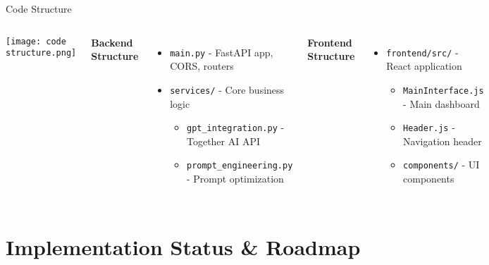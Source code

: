 \documentclass[aspectratio=169,xcolor=dvipsnames]{beamer}
\begin{document}
    \begin{frame}{Code Structure}
        \begin{columns}[c]
            \vspace{-0.5cm}
            \begin{center}
                \texttt{[image: code structure.png]}
            \end{center}

            \textbf{Backend Structure}
            \begin{itemize}
                \item \texttt{main.py} - FastAPI app, CORS, routers
                \item \texttt{services/} - Core business logic
                \begin{itemize}
                    \item \texttt{gpt\_integration.py} - Together AI API
                    \item \texttt{prompt\_engineering.py} - Prompt optimization
                \end{itemize}
            \end{itemize}
            
            \textbf{Frontend Structure}
            \begin{itemize}
                \item \texttt{frontend/src/} - React application
                \begin{itemize}
                    \item \texttt{MainInterface.js} - Main dashboard
                    \item \texttt{Header.js} - Navigation header
                    \item \texttt{components/} - UI components
                \end{itemize}
            \end{itemize}
        \end{columns}
    \end{frame}

\section{Implementation Status \& Roadmap}
\end{document}

